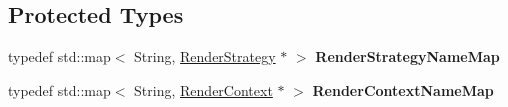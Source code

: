 \subsection*{\-Protected \-Types}
\begin{DoxyCompactItemize}
\item 
\hypertarget{class_verdi_1_1_render_system_af9d330b02db5b75e5695fb9f655c9272}{typedef std\-::map$<$ \-String, \*
\hyperlink{class_verdi_1_1_render_strategy}{\-Render\-Strategy} $\ast$ $>$ {\bfseries \-Render\-Strategy\-Name\-Map}}\label{class_verdi_1_1_render_system_af9d330b02db5b75e5695fb9f655c9272}

\item 
\hypertarget{class_verdi_1_1_render_system_a0a05c8c3c33289855d7b4b95fcbffc90}{typedef std\-::map$<$ \-String, \*
\hyperlink{class_verdi_1_1_render_context}{\-Render\-Context} $\ast$ $>$ {\bfseries \-Render\-Context\-Name\-Map}}\label{class_verdi_1_1_render_system_a0a05c8c3c33289855d7b4b95fcbffc90}

\end{DoxyCompactItemize}

